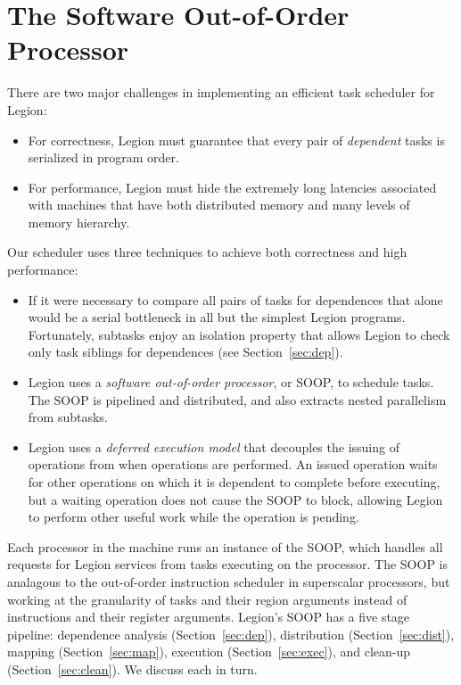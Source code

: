 \section{The Software Out-of-Order Processor}
\label{sec:soop}

There are two major challenges in implementing an efficient task
scheduler for Legion:
\begin{itemize}
\item  For correctness, Legion must guarantee that every pair of {\em dependent} tasks is serialized in program order.

\item For performance, Legion must hide the extremely long latencies associated
  with machines that have both distributed memory and many levels of
  memory hierarchy.
\end{itemize}
Our scheduler uses three techniques to achieve both correctness and high performance:
\begin{itemize}
\item If it were necessary to compare all pairs of tasks for dependences that alone
would be a serial bottleneck in all but the simplest Legion programs.  Fortunately,
subtasks enjoy an isolation property that allows Legion to check only task siblings for dependences
(see Section~\ref{sec:dep}).

\item Legion uses a {\em  software out-of-order processor}, or SOOP, to schedule tasks.  The SOOP 
is pipelined and distributed, and also extracts nested parallelism from subtasks.

\item Legion uses a {\em deferred execution model} that decouples the issuing
of operations from when operations are performed.  An issued operation waits for other operations on
which it is dependent to complete before executing, but a waiting operation does not cause the SOOP
to block, allowing Legion to perform other useful work while the operation is pending.  


\end{itemize}

Each processor in the machine runs an instance of the SOOP, which handles all requests
for Legion services from tasks executing on the processor.  The SOOP is analagous to the out-of-order
instruction scheduler in superscalar processors, but working at the granularity of tasks and their region
arguments instead of instructions and their register arguments.
Legion's SOOP has a five stage pipeline: dependence analysis (Section~\ref{sec:dep}),
distribution (Section~\ref{sec:dist}),
mapping (Section~\ref{sec:map}),
execution (Section~\ref{sec:exec}),
and clean-up (Section~\ref{sec:clean}).
We discuss each in turn.

